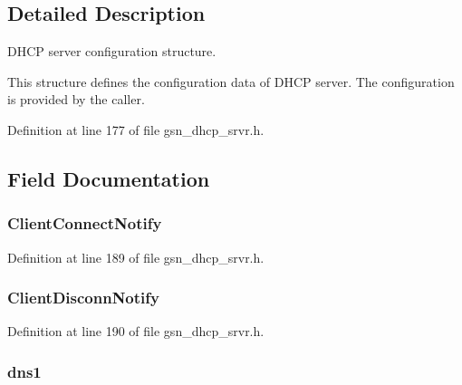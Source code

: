 \subsection{Detailed Description}
DHCP server configuration structure. 

This structure defines the configuration data of DHCP server. The configuration is provided by the caller. 

Definition at line 177 of file gsn\_\-dhcp\_\-srvr.h.



\subsection{Field Documentation}
\hypertarget{a00044_a79c7531f6c009a9edf285607476d8dda}{
\subsubsection[{ClientConnectNotify}]{ {\bf ClientConnectNotify}}}
\label{a00044_a79c7531f6c009a9edf285607476d8dda}


Definition at line 189 of file gsn\_\-dhcp\_\-srvr.h.

\hypertarget{a00044_a529afc0130cceb30c97f8bb886d04068}{
\subsubsection[{ClientDisconnNotify}]{ {\bf ClientDisconnNotify}}}
\label{a00044_a529afc0130cceb30c97f8bb886d04068}


Definition at line 190 of file gsn\_\-dhcp\_\-srvr.h.

\hypertarget{a00044_af7cddde4fa5268b2b98e6f9c96f777ae}{
\subsubsection[{dns1}]{ {\bf dns1}}}
\label{a00044_af7cddde4fa5268b2b98e6f9c96f777ae}


